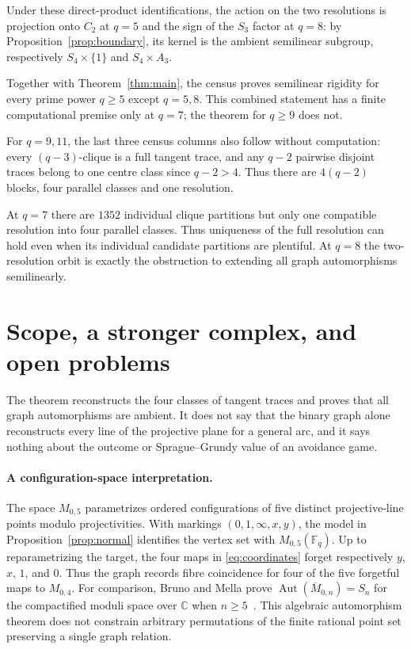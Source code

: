 \documentclass[11pt]{article}
\theoremstyle{definition}
\theoremstyle{remark}
\newcommand{\F}{\mathbb F}
\newcommand{\Aut}{\operatorname{Aut}}
\begin{document}
Under these direct-product identifications, the action on the two
resolutions is projection onto $C_2$ at $q=5$ and the sign of the $S_3$
factor at $q=8$: by Proposition~\ref{prop:boundary}, its kernel is the
ambient semilinear subgroup, respectively $S_4\times\{1\}$ and
$S_4\times A_3$.

Together with Theorem~\ref{thm:main}, the census proves semilinear rigidity
for every prime power $q\ge5$ except $q=5,8$. This combined statement has
a finite computational premise only at $q=7$; the theorem for $q\ge9$
does not.

For $q=9,11$, the last three census columns also follow without
computation: every $(q-3)$-clique is a full tangent trace, and any
$q-2$ pairwise disjoint traces belong to one centre class since $q-2>4$.
Thus there are $4(q-2)$ blocks, four parallel classes and one resolution.

At $q=7$ there are $1352$ individual clique partitions but only one
compatible resolution into four parallel classes. Thus uniqueness of the full resolution
can hold even when its individual candidate partitions are plentiful.
At $q=8$ the two-resolution orbit is exactly the obstruction to extending
all graph automorphisms semilinearly.

\section{Scope, a stronger complex, and open problems}
\label{sec:remarks}

The theorem reconstructs the four classes of tangent traces and proves that
all graph automorphisms are ambient.  It does not say that the binary graph
alone reconstructs every line of the projective plane for a general arc,
and it says nothing about the outcome or Sprague--Grundy value of an
avoidance game.

\paragraph{A configuration-space interpretation.}
The space $M_{0,5}$ parametrizes ordered configurations of five distinct
projective-line points modulo projectivities. With markings
$(0,1,\infty,x,y)$, the model in Proposition~\ref{prop:normal} identifies the
vertex set with $M_{0,5}(\F_q)$. Up to reparametrizing the target, the four
maps in \eqref{eq:coordinates} forget respectively $y$, $x$, $1$, and $0$. Thus the graph
records fibre coincidence for four of the five forgetful maps to $M_{0,4}$.
For comparison, Bruno and Mella prove
$\Aut(\overline{M}_{0,n})=S_n$ for the compactified moduli space over
$\mathbb C$ when $n\ge5$~\cite[Theorem 3]{BrunoMella}. This algebraic
automorphism theorem does not constrain arbitrary permutations of the
finite rational point set preserving a single graph relation.
\end{document}
